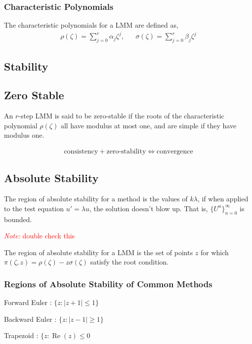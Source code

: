 \documentclass[12pt]{article}
\newcommand{\note}[1]{\textcolor{red}{\textit{Note:} #1}}
\begin{document}
\subsubsection{Characteristic Polynomials}
The characteristic polynomials for a LMM are defined as,
\begin{align*}
    \rho(\zeta) = \sum_{j=0}^{r} \alpha_j \zeta^j, && \sigma(\zeta) = \sum_{j=0}^{r} \beta_j \zeta^j
\end{align*}



\subsection{Stability}

\subsection{Zero Stable}
An \( r \)-step LMM is said to be zero-stable if the roots of the characteristic polynomial \( \rho(\zeta) \) all have modulus at most one, and are simple if they have modulus one.

\begin{align*}
    \text{consistency} + \text{zero-stability} \Longleftrightarrow \text{convergence}
\end{align*}


\subsection{Absolute Stability}
The region of absolute stability for a method is the values of \( k\lambda \), if when applied to the test equation \( u' = \lambda u \), the solution doesn't blow up. That is, \( \{ U^n \}_{n=0}^{\infty} \) is bounded.

\note{double check this}

The region of absolute stability for a LMM is the set of points \( z \) for which \( \pi(\zeta,z) = \rho(\zeta) - z \sigma(\zeta) \) satisfy the root condition.


\subsubsection{Regions of Absolute Stability of Common Methods}

Forward Euler : \( \{z : |z+1|\leq 1 \} \)

Backward Euler : \( \{ z : |z-1| \geq 1 \} \)

Trapezoid : \( \{ z : \operatorname{Re}(z) \leq 0 \)
\end{document}

